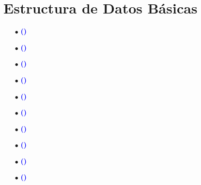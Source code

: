 \documentclass[12pt]{article}
\begin{document}
\section{Estructura de Datos Básicas}
{
    
    \begin{enumerate}
        \item[$\bullet$]\textbf{\textcolor{blue}{()}  }{}
        
        \item[$\bullet$]\textbf{\textcolor{blue}{()}  }{}
        
        \item[$\bullet$]\textbf{\textcolor{blue}{()}  }{}
        
        \item[$\bullet$]\textbf{\textcolor{blue}{()}  }{}
        
        \item[$\bullet$]\textbf{\textcolor{blue}{()}  }{}
        
        \item[$\bullet$]\textbf{\textcolor{blue}{()}  }{}
        
        \item[$\bullet$]\textbf{\textcolor{blue}{()}  }{}
        
        \item[$\bullet$]\textbf{\textcolor{blue}{()}  }{}
        
        \item[$\bullet$]\textbf{\textcolor{blue}{()}  }{}
        
        \item[$\bullet$]\textbf{\textcolor{blue}{()}  }{}
    \end{enumerate}
    
}
\end{document}
